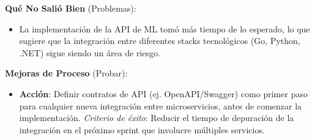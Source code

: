 \textbf{Qué No Salió Bien} (Problemas):
\begin{itemize}
    \item La implementación de la API de ML tomó más tiempo de lo esperado, lo que sugiere que la integración entre diferentes stacks tecnológicos (Go, Python, .NET) sigue siendo un área de riesgo.
\end{itemize}

\textbf{Mejoras de Proceso} (Probar):
\begin{itemize}
    \item \textbf{Acción}: Definir contratos de API (ej. OpenAPI/Swagger) como primer paso para cualquier nueva integración entre microservicios, antes de comenzar la implementación. \textit{Criterio de éxito}: Reducir el tiempo de depuración de la integración en el próximo sprint que involucre múltiples servicios.
\end{itemize}

